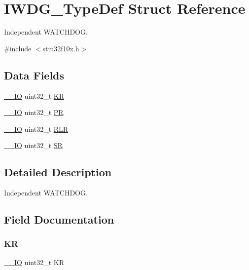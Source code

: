 \hypertarget{struct_i_w_d_g___type_def}{}\section{I\+W\+D\+G\+\_\+\+Type\+Def Struct Reference}
\label{struct_i_w_d_g___type_def}


Independent W\+A\+T\+C\+H\+D\+OG.  




{\ttfamily \#include $<$stm32f10x.\+h$>$}

\subsection*{Data Fields}
\begin{DoxyCompactItemize}
\item 
\mbox{\hyperlink{core__sc300_8h_aec43007d9998a0a0e01faede4133d6be}{\+\_\+\+\_\+\+IO}} uint32\+\_\+t \mbox{\hyperlink{struct_i_w_d_g___type_def_a2f692354bde770f2a5e3e1b294ec064b}{KR}}
\item 
\mbox{\hyperlink{core__sc300_8h_aec43007d9998a0a0e01faede4133d6be}{\+\_\+\+\_\+\+IO}} uint32\+\_\+t \mbox{\hyperlink{struct_i_w_d_g___type_def_af8d25514079514d38c104402f46470af}{PR}}
\item 
\mbox{\hyperlink{core__sc300_8h_aec43007d9998a0a0e01faede4133d6be}{\+\_\+\+\_\+\+IO}} uint32\+\_\+t \mbox{\hyperlink{struct_i_w_d_g___type_def_a7015e1046dbd3ea8783b33dc11a69e52}{R\+LR}}
\item 
\mbox{\hyperlink{core__sc300_8h_aec43007d9998a0a0e01faede4133d6be}{\+\_\+\+\_\+\+IO}} uint32\+\_\+t \mbox{\hyperlink{struct_i_w_d_g___type_def_af6aca2bbd40c0fb6df7c3aebe224a360}{SR}}
\end{DoxyCompactItemize}


\subsection{Detailed Description}
Independent W\+A\+T\+C\+H\+D\+OG. 

\subsection{Field Documentation}
\mbox{\label{struct_i_w_d_g___type_def_a2f692354bde770f2a5e3e1b294ec064b}} 
\subsubsection{\texorpdfstring{KR}{KR}}
{\footnotesize\ttfamily \mbox{\hyperlink{core__sc300_8h_aec43007d9998a0a0e01faede4133d6be}{\+\_\+\+\_\+\+IO}} uint32\+\_\+t KR}

